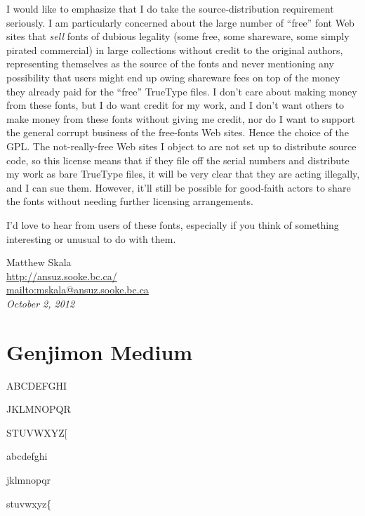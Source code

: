 \documentclass{mitsuba}
\begin{document}
I would like to emphasize that I do take the source-distribution
requirement seriously.  I am particularly concerned about the large number
of ``free'' font Web sites that \emph{sell} fonts of dubious legality (some
free, some shareware, some simply pirated commercial) in large collections
without credit to the original authors, representing themselves as the
source of the fonts and never mentioning any possibility that users might
end up owing shareware fees on top of the money they already paid for the
``free'' TrueType files.  I don't care about making money from these fonts,
but I do want credit for my work, and I don't want others to make money from
these fonts without giving me credit, nor do I want to support the general
corrupt business of the free-fonts Web sites. Hence the choice of the GPL. 
The not-really-free Web sites I object to are not set up to distribute
source code, so this license means that if they file off the serial numbers
and distribute my work as bare TrueType files, it will be very clear that
they are acting illegally, and I can sue them.  However, it'll still be
possible for good-faith actors to share the fonts without needing further
licensing arrangements.

I'd love to hear from users of these fonts, especially if you think of
something interesting or unusual to do with them.

\vspace{\baselineskip}

\noindent Matthew Skala\\
\url{http://ansuz.sooke.bc.ca/}\\
\url{mailto:mskala@ansuz.sooke.bc.ca}\\
\textit{October 2, 2012}


\onecolumn

\setlength{\parindent}{0pt}
\setlength{\parskip}{\baselineskip}

\chapter{Genjimon Medium}

{
ABCDEFGHI

JKLMNOPQR

STUVWXYZ[

abcdefghi

jklmnopqr

stuvwxyz\{}
\end{document}
